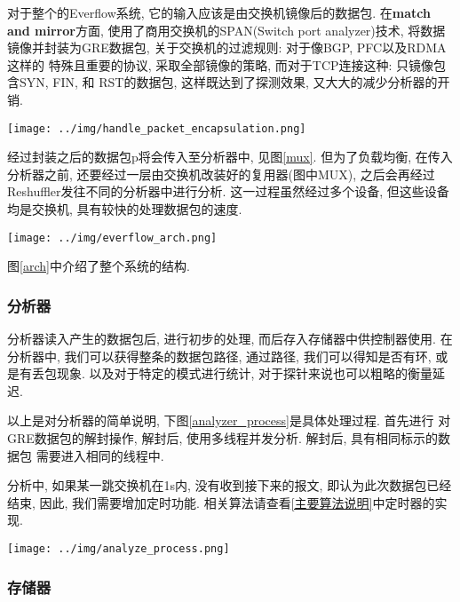 {\begin{mdframed}[everyline=true]
  对于整个的Everflow系统, 它的输入应该是由交换机镜像后的数据包.
在\textbf{match and mirror}方面, 使用了商用交换机的SPAN(Switch port analyzer)技术,
将数据镜像并封装为GRE数据包, 关于交换机的过滤规则: 对于像BGP, PFC以及RDMA这样的
特殊且重要的协议, 采取全部镜像的策略, 而对于TCP连接这种: 只镜像包含SYN, FIN, 和
RST的数据包, 这样既达到了探测效果, 又大大的减少分析器的开销.

\begin{center}
    \texttt{[image: ../img/handle\_packet\_encapsulation.png]}
    \label{mux}
\end{center}

经过封装之后的数据包p将会传入至分析器中, 见图\ref{mux}. 但为了负载均衡,
在传入分析器之前, 还要经过一层由交换机改装好的复用器(图中MUX),
之后会再经过Reshuffler发往不同的分析器中进行分析. 这一过程虽然经过多个设备,
但这些设备均是交换机, 具有较快的处理数据包的速度.

\begin{center}
    \texttt{[image: ../img/everflow\_arch.png]}
    \label{arch}
\end{center}

图\ref{arch}中介绍了整个系统的结构.

\subsubsection{分析器}

  分析器读入产生的数据包后, 进行初步的处理, 而后存入存储器中供控制器使用.
在分析器中, 我们可以获得整条的数据包路径, 通过路径, 我们可以得知是否有环,
或是有丢包现象. 以及对于特定的模式进行统计, 对于探针来说也可以粗略的衡量延迟.

  以上是对分析器的简单说明, 下图\ref{analyzer_process}是具体处理过程. 首先进行
对GRE数据包的解封操作, 解封后, 使用多线程并发分析. 解封后, 具有相同标示的数据包
需要进入相同的线程中.

   分析中, 如果某一跳交换机在1s内, 没有收到接下来的报文, 即认为此次数据包已经结束,
因此, 我们需要增加定时功能. 相关算法请查看\ref{主要算法说明}中定时器的实现.

\begin{center}
    \texttt{[image: ../img/analyze\_process.png]}
    \label{analyzer_process}
\end{center}

\subsubsection{存储器}


\end{mdframed}}
